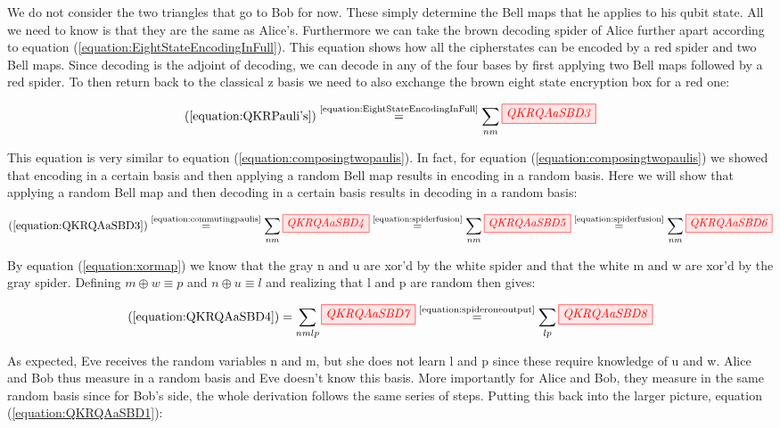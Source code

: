 \documentclass[]{article}
\newcommand{\equaltext}[1]{\ensuremath{\stackrel{\text{#1}}{=}}}
\begin{document}
We do not consider the two triangles that go to Bob for now. These simply determine the Bell maps that he applies to his qubit state. All we need to know is that they are the same as Alice's. Furthermore we can take the brown decoding spider of Alice further apart according to equation (\ref{equation:EightStateEncodingInFull}). This equation shows how all the cipherstates can be encoded by a red spider and two Bell maps. Since decoding is the adjoint of decoding, we can decode in any of the four bases by first applying two Bell maps followed by a red spider. To then return back to the classical z basis we need to also exchange the brown eight state encryption box for a red one:

\begin{equation}
	\label{equation:QKRQAaSBD3}
	(\ref{equation:QKRPauli's}) \equaltext{\ref{equation:EightStateEncodingInFull}} \sum\limits_{nm}\tikzfig{QKRQAaSBD3}
\end{equation}

This equation is very similar to equation (\ref{equation:composingtwopaulis}). In fact, for equation (\ref{equation:composingtwopaulis}) we showed that encoding in a certain basis and then applying a random Bell map results in encoding in a random basis. Here we will show that applying a random Bell map and then decoding in a certain basis results in decoding in a random basis:

\begin{equation}
\label{equation:QKRQAaSBD4}
(\ref{equation:QKRQAaSBD3}) \equaltext{\ref{equation:commutingpaulis}} \sum\limits_{nm}\tikzfig{QKRQAaSBD4} \equaltext{\ref{equation:spiderfusion}} \sum\limits_{nm}\tikzfig{QKRQAaSBD5} \equaltext{\ref{equation:spiderfusion}} \sum\limits_{nm}\tikzfig{QKRQAaSBD6} 
\end{equation}

By equation (\ref{equation:xormap}) we know that the gray n and u are xor'd by the white spider and that the white m and w are xor'd by the gray spider. Defining $m \oplus w \equiv p$ and $n \oplus u \equiv l$ and realizing that l and p are random then gives: 

\begin{equation}
	\label{equation:randompaulidecoding}
	(\ref{equation:QKRQAaSBD4}) = 
	\sum\limits_{nmlp}\tikzfig{QKRQAaSBD7} \equaltext{\ref{equation:spideroneoutput}} \sum\limits_{lp}\tikzfig{QKRQAaSBD8}
\end{equation}

As expected, Eve receives the random variables n and m, but she does not learn l and p since these require knowledge of u and w. Alice and Bob thus measure in a random basis and Eve doesn't know this basis. More importantly for Alice and Bob, they measure in the same random basis since for Bob's side, the whole derivation follows the same series of steps. Putting this back into the larger picture, equation (\ref{equation:QKRQAaSBD1}):
\end{document}
